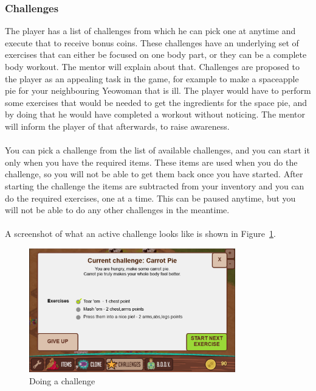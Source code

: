 \subsubsection{Challenges}
The player has a list of challenges from which he can pick one at anytime and execute that to receive bonus coins. These challenges have an underlying set of exercises that can either be focused on one body part, or they can be a complete body workout. The mentor will explain about that. Challenges are proposed to the player as an appealing task in the game, for example to make a spaceapple pie for your neighbouring Yeowoman that is ill. The player would have to perform some exercises that would be needed to get the ingredients for the space pie, and by doing that he would have completed a workout without noticing. The mentor will inform the player of that afterwards, to raise awareness.
\\\\
You can pick a challenge from the list of available challenges, and you can start it only when you have the required items. These items are used when you do the challenge, so you will not be able to get them back once you have started. After starting the challenge the items are subtracted from your inventory and you can do the required exercises, one at a time. This can be paused anytime, but you will not be able to do any other challenges in the meantime.
\\\\
A screenshot of what an active challenge looks like is shown in Figure~\ref{fig:challenge}.

\begin{figure}[h]
	\centering
		\includegraphics[width=0.80\textwidth]{images/challenge.png}
	\caption{Doing a challenge}
	\label{fig:challenge}
\end{figure}

